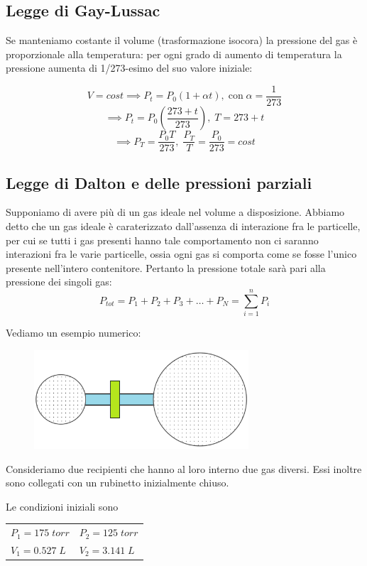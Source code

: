 \subsection{Legge di Gay-Lussac}
Se manteniamo costante il volume (trasformazione isocora) la pressione del gas è proporzionale alla temperatura: per ogni grado di aumento di temperatura la pressione aumenta di 1/273-esimo del suo valore iniziale:

$$V=cost \implies P_t=P_0(1 + \alpha t), \; \text{con} \; \alpha=\frac{1}{273}$$
$$\implies P_t=P_0 \left( \frac{273 + t}{273} \right), \; T=273 + t$$
$$\implies P_T = \frac{P_0 T}{273}, \; \frac{P_T}{T}=\frac{P_0}{273}=cost$$

\subsection{Legge di Dalton e delle pressioni parziali}
Supponiamo di avere più di un gas ideale nel volume a disposizione. Abbiamo detto che un gas ideale è caraterizzato dall'assenza di interazione fra le particelle, per cui se tutti i gas presenti hanno tale comportamento non ci saranno interazioni fra le varie particelle, ossia ogni gas si comporta come se fosse l'unico presente nell'intero contenitore. Pertanto la pressione totale sarà pari alla pressione dei singoli gas:
$$P_{tot}=P_1 + P_2 + P_3 + \dots + P_N = \sum_{i=1}^nP_i$$

Vediamo un esempio numerico:

\vspace{-0.3cm}
\hspace{0.5cm}\begin{minipage}{0.55 \textwidth}
    \begin{figure}[H]
        \includegraphics[width=8cm]{immagini/serbatoio.png}
    \end{figure}
\end{minipage}
\begin{minipage}{0.4 \textwidth}
\vspace{0.8cm}Consideriamo due recipienti che hanno al loro interno due gas diversi. Essi inoltre sono collegati con un rubinetto inizialmente chiuso.

Le condizioni iniziali sono

\begin{center}
    \begin{tabular}{p{2.5cm}p{2.5cm}}
        $P_1=175 \; torr$ & $P_2=125 \; torr$\\[1ex]
        $V_1=0.527 \; L$ & $V_2=3.141 \; L$
    \end{tabular}
\end{center}
\end{minipage}

